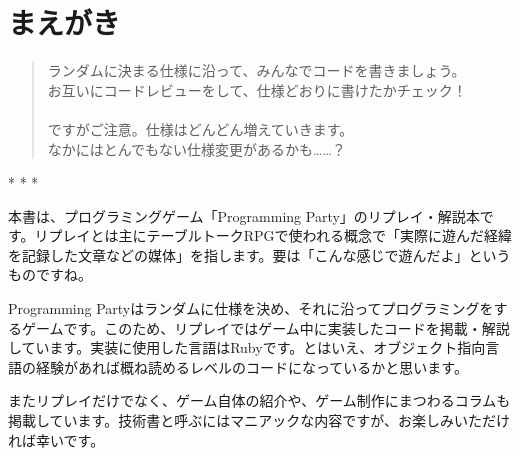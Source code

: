 \documentclass[index]{subfiles}
\begin{document}
  \chapter*{まえがき}
  
\begin{quote}
\noindent
ランダムに決まる仕様に沿って、みんなでコードを書きましょう。 \\
お互いにコードレビューをして、仕様どおりに書けたかチェック！ \\
\\
ですがご注意。仕様はどんどん増えていきます。\\
なかにはとんでもない仕様変更があるかも……？ 
\end{quote}

\begin{center}
* * *
\end{center}

本書は、プログラミングゲーム「Programming Party」のリプレイ・解説本です。リプレイとは主にテーブルトークRPGで使われる概念で「実際に遊んだ経緯を記録した文章などの媒体」を指します。要は「こんな感じで遊んだよ」というものですね。

Programming Partyはランダムに仕様を決め、それに沿ってプログラミングをするゲームです。このため、リプレイではゲーム中に実装したコードを掲載・解説しています。実装に使用した言語はRubyです。とはいえ、オブジェクト指向言語の経験があれば概ね読めるレベルのコードになっているかと思います。

またリプレイだけでなく、ゲーム自体の紹介や、ゲーム制作にまつわるコラムも掲載しています。技術書と呼ぶにはマニアックな内容ですが、お楽しみいただければ幸いです。
\end{document}

